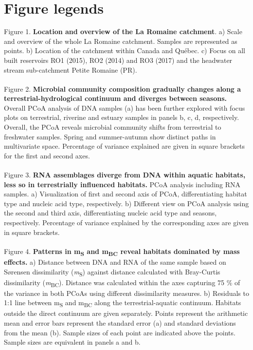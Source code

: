 \documentclass[12pt,a4paper]{article} %
\begin{document}
\section*{Figure legends}
Figure 1. \textbf{Location and overview of the La Romaine catchment}. a) Scale and overview of the whole La Romaine catchment. Samples are represented as points. b) Location of the catchment within Canada and Québec. c) Focus on all built reservoirs RO1 (2015), RO2 (2014) and RO3 (2017) and the headwater stream sub-catchment Petite Romaine (PR).\\
\\
Figure 2. \textbf{Microbial community composition gradually changes along a terrestrial-hydrological continuum and diverges between seasons.} Overall PCoA analysis of DNA samples (a) has been further explored with focus plots on terrestrial, riverine and estuary samples in panels b, c, d, respectively. Overall, the PCoA reveals microbial community shifts from terrestrial to freshwater samples. Spring and summer-autumn show distinct paths in multivariate space. Percentage of variance explained are given in square brackets for the first and second axes. \\
\\
Figure 3. \textbf{RNA assemblages diverge from DNA within aquatic habitats, less so in terrestrially influenced habitats.} PCoA analysis including RNA samples. a) Visualization of first and second axis of PCoA, differentiating habitat type and nucleic acid type, respectively. b) Different view on PCoA analysis using the second and third axis, differentiating nucleic acid type and seasons, respectively. Percentage of variance explained by the corresponding axes are given in square brackets.\\
\\
Figure 4. \textbf{Patterns in m\textsubscript{S} and m\textsubscript{BC} reveal habitats dominated by mass effects.} a) Distance between DNA and RNA of the same sample based on S{\o}rensen dissimilarity (\textit{m}\textsubscript{S}) against distance calculated with Bray-Curtis dissimilarity (\textit{m}\textsubscript{BC}). Distance was calculated within the axes capturing 75 \% of the variance in both PCoAs using different dissimilarity measures. b) Residuals to 1:1 line between m\textsubscript{S} and m\textsubscript{BC} along the terrestrial-aquatic continuum. Habitats outside the direct continuum are given separately. Points represent the arithmetic mean and error bars represent the standard error (a) and standard deviations from the mean (b). Sample sizes of each point are indicated above the points. Sample sizes are equivalent in panels a and b. \\
\end{document}
